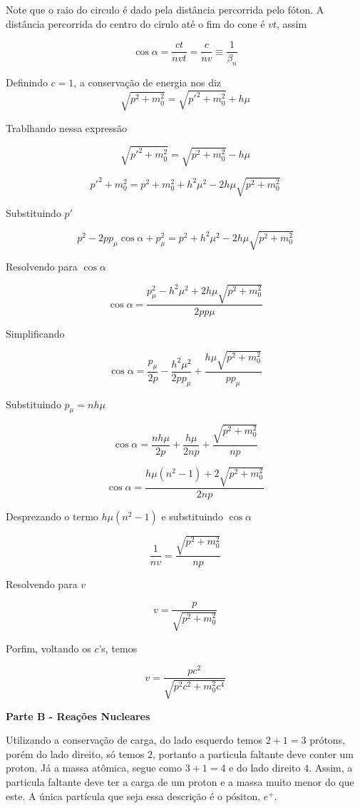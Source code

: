 \documentclass[11pt]{article}
\begin{document}
\begin{pproblem}
\begin{pssolution*}{}{}
\begin{alternativas}
        Note que o raio do circulo é dado pela distância percorrida pelo fóton. A distância percorrida do centro do cirulo até o fim do cone é \(vt\), assim

        \[\boxed{\cos\alpha = \frac{ct}{nvt} = \frac{c}{nv} \equiv \frac{1}{\beta_n}}\]

        \item Definindo \(c=1\), a conservação de energia nos diz
        \[\sqrt{p^2+m_0^2} = \sqrt{p'^2+m_0^2}+h\mu\]

        Trablhando nessa expressão

        \[\sqrt{p'^2 + m_0^2} = \sqrt{p^2+m_0^2} - h\mu\]

        \[p'^2 + m_0^2 = p^2+m_0^2 + h^2\mu^2 - 2h\mu\sqrt{p^2+m_0^2}\]

        Substituindo \(p'\)

        \[p^2-2pp_\mu\cos\alpha+p^2_\mu = p^2+h^2\mu^2 - 2h\mu\sqrt{p^2+m_0^2}\]

        Resolvendo para \(\cos\alpha\) 

        \[\cos\alpha = \frac{p_\mu^2 - h^2\mu^2+2h\mu\sqrt{p^2+m_0^2}}{2pp\mu}\]

        Simplificando 

        \[\cos\alpha = \frac{p_\mu}{2p} - \frac{h^2\mu^2}{2pp_\mu} + \frac{h\mu\sqrt{p^2+m_0^2}}{pp_\mu}\]
        
        Substituindo \(p_\mu = nh\mu\)

        \[\cos\alpha = \frac{nh\mu}{2p} + \frac{h\mu}{2np}+ \frac{\sqrt{p^2+m_0^2}}{np}\]

        \[\cos\alpha = \frac{h\mu(n^2-1)+2\sqrt{p^2+m_0^2}}{2np}\]

        Desprezando o termo \(h\mu(n^2-1)\) e substituindo \(\cos\alpha\)

        \[\frac{1}{nv} = \frac{\sqrt{p^2+m_0^2}}{np}\]

        Resolvendo para \(v\)

        \[v = \frac{p}{\sqrt{p^2+m_0^2}}\]

        Porfim, voltando os \(c\)'s, temos 

        \[\boxed{v = \frac{pc^2}{\sqrt{p^2c^2+m_0^2c^4}}}\]

        \begin{center}
            \textbf{Parte B - Reações Nucleares}    
        \end{center}

        \item Utilizando a conservação de carga, do lado esquerdo temos \(2+1=3\) prótons, porém do lado direito, só temos \(2\), portanto a particula faltante deve conter um proton. Já a massa atômica, segue como \(3+1=4\) e do lado direito \(4\). Assim, a particula faltante deve ter a carga de um proton e a massa muito menor do que este. A única partícula que seja essa descrição é o \(\boxed{\text{pósiton, }e^+}\).
            

\end{alternativas}
\end{pssolution*}
\end{pproblem}
\end{document}
